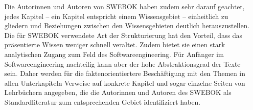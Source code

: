 Die Autorinnen und Autoren von SWEBOK haben zudem sehr darauf geachtet, jedes Kapitel – ein Kapitel entspricht einem Wissensgebiet – einheitlich zu gliedern und Beziehungen zwischen den Wissensgebieten deutlich herauszustellen. Die für SWEBOK verwendete Art der Strukturierung hat den Vorteil, dass das präsentierte Wissen weniger schnell veraltet. Zudem bietet sie einen stark analytischen Zugang zum Feld des Softwareengineering. Für Anfänger im Softwareengineering nachteilig kann aber der hohe Abstraktionsgrad der Texte sein. Daher werden für die fakten\-orien\-tier\-tere Beschäftigung mit den Themen in allen Unterkapiteln Verweise auf konkrete Kapitel und sogar einzelne Seiten von Lehrbüchern angegeben, die die Autorinnen und Autoren des SWEBOK als Standardliteratur zum entsprechenden Gebiet identifiziert haben. 